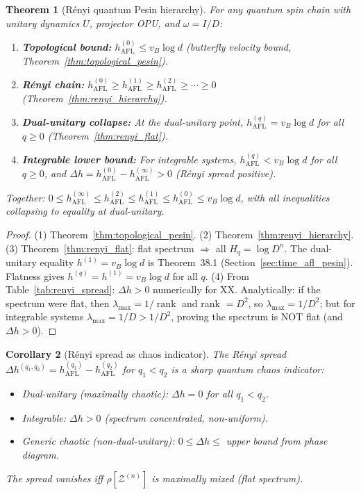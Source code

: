 \documentclass[12pt,a4paper]{article}
\newtheorem{theorem}{Theorem}[section]
\newtheorem{corollary}[theorem]{Corollary}
\begin{document}
\begin{theorem}[R\'enyi quantum Pesin hierarchy]
  \label{thm:renyi_pesin}
  For any quantum spin chain with unitary dynamics $U$, projector OPU,
  and $\omega = I/D$:
  \begin{enumerate}
    \item \textbf{Topological bound:} $h_{\mathrm{AFL}}^{(0)} \leq v_B\log d$
      (butterfly velocity bound, Theorem~\ref{thm:topological_pesin}).
    \item \textbf{R\'enyi chain:} $h_{\mathrm{AFL}}^{(0)} \geq h_{\mathrm{AFL}}^{(1)} \geq h_{\mathrm{AFL}}^{(2)} \geq \cdots \geq 0$
      (Theorem~\ref{thm:renyi_hierarchy}).
    \item \textbf{Dual-unitary collapse:} At the dual-unitary point,
      $h_{\mathrm{AFL}}^{(q)} = v_B\log d$ for all $q\geq 0$
      (Theorem~\ref{thm:renyi_flat}).
    \item \textbf{Integrable lower bound:} For integrable systems,
      $h_{\mathrm{AFL}}^{(q)} < v_B\log d$ for all $q \geq 0$,
      and $\Delta h = h_{\mathrm{AFL}}^{(0)} - h_{\mathrm{AFL}}^{(\infty)} > 0$
      (R\'enyi spread positive).
  \end{enumerate}
  Together: $0 \leq h_{\mathrm{AFL}}^{(\infty)} \leq h_{\mathrm{AFL}}^{(2)} \leq h_{\mathrm{AFL}}^{(1)} \leq h_{\mathrm{AFL}}^{(0)} \leq v_B\log d$,
  with all inequalities collapsing to equality at dual-unitary.
\end{theorem}
\begin{proof}
  (1) Theorem~\ref{thm:topological_pesin}.
  (2) Theorem~\ref{thm:renyi_hierarchy}.
  (3) Theorem~\ref{thm:renyi_flat}: flat spectrum $\Rightarrow$ all $H_q = \log D^n$.
    The dual-unitary equality $h^{(1)} = v_B\log d$ is Theorem~38.1 (Section~\ref{sec:time_afl_pesin}).
    Flatness gives $h^{(q)} = h^{(1)} = v_B\log d$ for all $q$.
  (4) From Table~\ref{tab:renyi_spread}: $\Delta h > 0$ numerically for XX.
    Analytically: if the spectrum were flat, then $\lambda_{\max} = 1/\operatorname{rank}$
    and rank $= D^2$, so $\lambda_{\max} = 1/D^2$; but for integrable systems
    $\lambda_{\max} = 1/D > 1/D^2$, proving the spectrum is NOT flat (and
    $\Delta h > 0$).
\end{proof}

\begin{corollary}[R\'enyi spread as chaos indicator]
  \label{cor:renyi_chaos}
  The R\'enyi spread $\Delta h^{(q_1,q_2)} = h_{\mathrm{AFL}}^{(q_1)} - h_{\mathrm{AFL}}^{(q_2)}$
  for $q_1 < q_2$ is a \emph{sharp quantum chaos indicator}:
  \begin{itemize}
    \item Dual-unitary (maximally chaotic): $\Delta h = 0$ for all $q_1 < q_2$.
    \item Integrable: $\Delta h > 0$ (spectrum concentrated, non-uniform).
    \item Generic chaotic (non-dual-unitary): $0 \leq \Delta h \leq$ upper bound from phase diagram.
  \end{itemize}
  The spread vanishes iff $\rho[\mathcal{Z}^{(n)}]$ is maximally mixed (flat spectrum).
\end{corollary}
\end{document}
